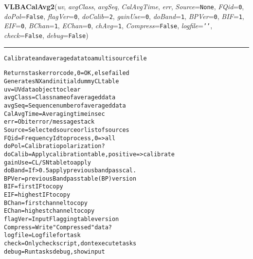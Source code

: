     \label{VLBACal:VLBACalAvg2}
    \vspace{0.5ex}

    \begin{boxedminipage}{\textwidth}

    \raggedright \textbf{VLBACalAvg2}(\textit{uv}, \textit{avgClass}, \textit{avgSeq}, \textit{CalAvgTime}, \textit{err}, \textit{Source}=\texttt{N\-o\-n\-e\-}, \textit{FQid}=\texttt{0\-}, \textit{doPol}=\texttt{F\-a\-l\-s\-e\-}, \textit{flagVer}=\texttt{0\-}, \textit{doCalib}=\texttt{2\-}, \textit{gainUse}=\texttt{0\-}, \textit{doBand}=\texttt{1\-}, \textit{BPVer}=\texttt{0\-}, \textit{BIF}=\texttt{1\-}, \textit{EIF}=\texttt{0\-}, \textit{BChan}=\texttt{1\-}, \textit{EChan}=\texttt{0\-}, \textit{chAvg}=\texttt{1\-}, \textit{Compress}=\texttt{F\-a\-l\-s\-e\-}, \textit{logfile}=\texttt{'\-'\-}, \textit{check}=\texttt{F\-a\-l\-s\-e\-}, \textit{debug}=\texttt{F\-a\-l\-s\-e\-})

    \vspace{-1.5ex}

    \rule{\textwidth}{0.5\fboxrule}
\begin{alltt}
Calibrate and average data to a multisource file

Returns task error code, 0=OK, else failed
Generates NX and initial dummy CL table
uv         = UV data object to clear
avgClass   = Class name of averaged data
avgSeq     = Sequence number of averaged data
CalAvgTime = Averaging time in sec
err        = Obit error/message stack
Source     = Selected source or list of sources
FQid       = Frequency Id to process, 0={\textgreater}all
doPol      = Calibratio polarization?
doCalib    = Apply calibration table, positive={\textgreater}calibrate
gainUse    = CL/SN table to apply
doBand     = If {\textgreater}0.5 apply previous bandpass cal.
BPVer      = previous Bandpass table (BP) version
BIF        = first IF to copy
EIF        = highest IF to copy
BChan      = first channel to copy
EChan      = highest channel to copy
flagVer    = Input Flagging table version
Compress   = Write "Compressed" data?
logfile    = Log file for task
check      = Only check script, dont execute tasks
debug      = Run tasks debug, show input\end{alltt}

    \vspace{1ex}

    \end{boxedminipage}

